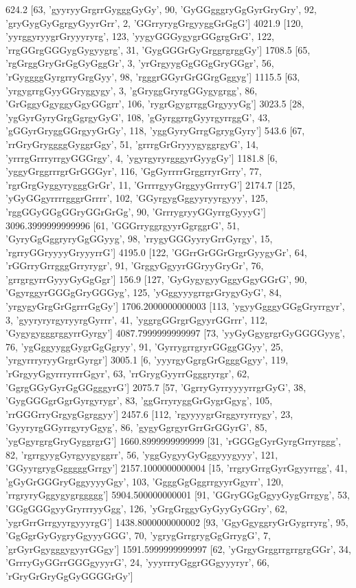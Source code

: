 624.2 [63, 'gyyryyGrgrrGygggGyGy', 90, 'GyGGgggryGgGyrGryGry', 92, 'gryGygGyGgrgyGyyrGrr', 2, 'GGrryrygGrgyyggGrGgG']
4021.9 [120, 'yyrggyryygrGryyyryrg', 123, 'yygyGGGygygrGGgrgGrG', 122, 'rrgGGrgGGGygGygyygrg', 31, 'GygGGGrGyGrggrgrggGy']
1708.5 [65, 'rgGrggGryGrGgGyGggGr', 3, 'yrGrgyygGgGGgGryGGgr', 56, 'rGyggggGyrgrryGrgGyy', 98, 'rgggrGGyrGrGGrgGggyg']
1115.5 [63, 'yrgygrrgGyyGGryggygy', 3, 'gGryggGryrgGGygygrgg', 86, 'GrGggyGgyggyGgyGGgrr', 106, 'rygrGgygrrggGrgyyyGg']
3023.5 [28, 'ygGyrGyryGrgGgrgyGyG', 108, 'gGyrggrrgGyyrgyrrggG', 43, 'gGGyrGryggGGrgyyGrGy', 118, 'yggGyryGrrgGgrygGyry']
543.6 [67, 'rrGryGryggggGyggrGgy', 51, 'grrrgGrGryyygyggrgyG', 14, 'yrrrgGrrryrrgyGGGrgy', 4, 'ygyrgyryrgggyrGyygGy']
1181.8 [6, 'yggyGrggrrrgrGrGGGyr', 116, 'GgGyrrrrGrggrryrGrry', 77, 'rgrGrgGyggyrygggGrGr', 11, 'GrrrrgyyGrggyyGrrryG']
2174.7 [125, 'yGyGGgyrrrrgggrGrrrr', 102, 'GGyrgygGggyyryyrgyyy', 125, 'rggGGyGGgGGryGGrGrGg', 90, 'GrrrygryyGGyrrgGyyyG']
3096.3999999999996 [61, 'GGGrryggrgyyrGgrggrG', 51, 'GyryGgGggryryGgGGyyg', 98, 'rrygyGGGyyryGrrGyrgy', 15, 'rgrryGGryyyyGryyyrrG']
4195.0 [122, 'GGrrGrGGrGrgrGyygyGr', 64, 'rGGrryGrrgggGrryrygr', 91, 'GrggyGgyyrGGryyGryGr', 76, 'grrgrgyrrGyyyGyGgGgr']
156.9 [127, 'GyGygygyyGggyGgyGGrG', 90, 'GgyrggyrGGGgGryGGGyg', 125, 'yGggyyygrrgrGrygyGyG', 84, 'yrgygyGrgGrGgrrrGgGy']
1706.2000000000003 [113, 'ygyyGgggyGGgGryrrgyr', 3, 'gyyryryrgyryyrgGyrrr', 41, 'yggrgGGrgrGgyyrGGrrr', 112, 'GygygygggrggyrrGyrgy']
4087.7999999999997 [73, 'yyGyGgygrgrGyGGGGyyg', 76, 'ygGggyyggGygrGgGgryy', 91, 'GyrrygrrgryrGGggGGyy', 25, 'yrgyrrryryyGrgrGyrgr']
3005.1 [6, 'yyyrgyGgrgGrGgggGgyy', 119, 'rGrgyyGgyrrryrrrGgyr', 63, 'rrGrygGyyrrGgggryrgr', 62, 'GgrgGGyGyrGgGGgggyrG']
2075.7 [57, 'GgrryGyrryyyyrrgrGyG', 38, 'GygGGGgrGgrGyrgyrygr', 83, 'ggGrryryggGrGygrGgyg', 105, 'rrGGGrryGrgygGgrggyy']
2457.6 [112, 'rgyyyygrGrggyryrrygy', 23, 'GyyryrgGGyrrgyryGgyg', 86, 'gygyGgrgyrGrrGrGGyrG', 85, 'ygGgyrgrgGryGyggrgrG']
1660.8999999999999 [31, 'rGGGgGyrGyrgGrryrggg', 82, 'rgrrgyygGyrgyygyggrr', 56, 'yggGygyyGyGggyyygyyy', 121, 'GGyyrgrygGgggggGrrgy']
2157.1000000000004 [15, 'rrgryGrrgGyrGgyyrrgg', 41, 'gGyGrGGGryGggyyyyGgy', 103, 'GgggGgGggrrgyyrGgyrr', 120, 'rrgryryGggygygrggggg']
5904.500000000001 [91, 'GGryGGgGgyyGygGrrgyg', 53, 'GGgGGGgyyGryrrryyGgg', 126, 'yGrgGrggyGyGyyGyGGry', 62, 'ygrGrrGrrgyyrgyyyrgG']
1438.8000000000002 [93, 'GgyGgyggryGrGygrryrg', 95, 'GgGgrGyGygryGgyyyGGG', 70, 'ygrygGrrgrygGgGrrygG', 7, 'grGyrGgygggygyyrGGgy']
1591.5999999999997 [62, 'yGrgyGrggrrgrrgrgGGr', 34, 'GrrryGyGGrrGGGgyyyrG', 24, 'yyyrrryGggrGGgyyyryr', 66, 'rGryGrGryGgGyGGGGrGy']
